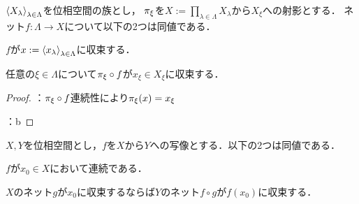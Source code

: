 \documentclass{ltjsbook}
\begin{document}
\begin{thmbox}
\begin{proposition}
\({\langle {X}_\lambda \rangle}_{\lambda \in \Lambda}\)を位相空間の族とし，
\(\pi_{\xi}\)を\(X := \prod_{\lambda \in \Lambda} X_\lambda\)から\(X_\xi\)への射影とする．
ネット\(f \colon \Lambda \to X\)について以下の2つは同値である．
\begin{conditions}
    \item\label{net-whole-convergence} \(f\)が\(x := {\langle {x}_{\lambda} \rangle}_{\lambda \in \Lambda}\)に収束する．
    \item\label{net-elementwise-convergence} 任意の\(\xi \in \Lambda\)について\(\pi_{\xi} \circ f\)が\(x_\xi \in X_\xi\)に収束する．
\end{conditions}
\end{proposition}
\end{thmbox}

\begin{proof}：\(\pi_{\xi} \circ f\)連続性により\(\pi_{\xi} (x) = x_\xi\)

：b

\end{proof}

\begin{thmbox}
\begin{theorem}
\(X, Y\)を位相空間とし，\(f\)を\(X\)から\(Y\)への写像とする．以下の2つは同値である．
\begin{conditions}
    \item\label{net-continuous} \(f\)が\(x_0 \in X\)において連続である．
    \item\label{net-f-lim-x-lim-f-x} \(X\)のネット\(g\)が\(x_0\)に収束するならば\(Y\)のネット\(f \circ g\)が\(f (x_0)\)に収束する．
\end{conditions}
\end{theorem}
\end{thmbox}
\end{document}
